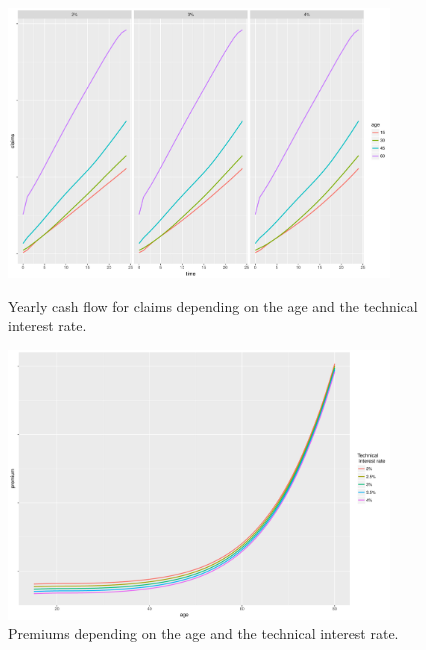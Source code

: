 \begin{figure}
	\centering
	\includegraphics[width=0.9\textwidth]{figures/chapter_sensitivities/sensitivity_age_claims}
	\caption{Yearly cash flow for claims depending on the age and the technical interest rate.}
	\label{fig:sensitivity_age_claims}
	
	\includegraphics[width=0.9\textwidth]{figures/chapter_sensitivities/sensitivity_age_premium}
	\caption{Premiums depending on the age and the technical interest rate.}
	\label{fig:sensitivity_age_premium}
\end{figure}


